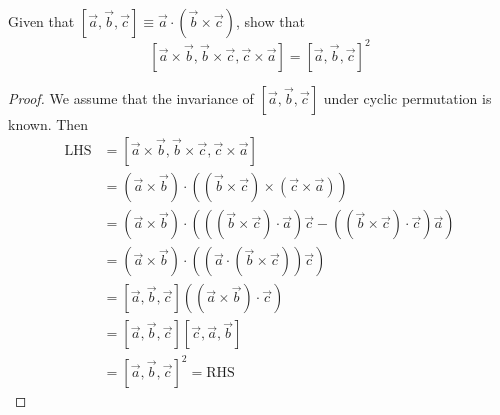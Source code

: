 \documentclass[12pt]{article}
\begin{document}
    \begin{subquestion}
        Given that $[\vec{a},\vec{b},\vec{c}] \equiv \vec{a}\cdot(\vec{b}\times\vec{c})$, show that
        \[
            [\vec{a}\times\vec{b},\vec{b}\times\vec{c},\vec{c}\times\vec{a}]
            = [\vec{a},\vec{b},\vec{c}]^{2}
        \]
    \end{subquestion}
    \begin{proof}
        We assume that the invariance of $[\vec{a},\vec{b},\vec{c}]$
        under cyclic permutation is known. Then
        \begin{align*}
            \text{LHS}
            &=[\vec{a}\times\vec{b},\vec{b}\times\vec{c},\vec{c}\times\vec{a}]\\
            &= (\vec{a}\times\vec{b})\cdot((\vec{b}\times\vec{c})\times(\vec{c}\times\vec{a}))\\
            &= (\vec{a}\times\vec{b})\cdot(
                ((\vec{b}\times\vec{c})\cdot\vec{a})\vec{c}
                - ((\vec{b}\times\vec{c})\cdot\vec{c})\vec{a}
            )\\
            &= (\vec{a}\times\vec{b})\cdot((\vec{a}\cdot(\vec{b}\times\vec{c}))\vec{c})\\
            &= [\vec{a},\vec{b},\vec{c}]((\vec{a}\times\vec{b})\cdot\vec{c})\\
            &= [\vec{a},\vec{b},\vec{c}][\vec{c},\vec{a},\vec{b}]\\
            &= [\vec{a},\vec{b},\vec{c}]^{2} = \text{RHS}
        \end{align*}
    \end{proof}
\end{document}
